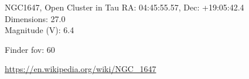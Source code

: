\begin{block}{NGC1647, Open Cluster in Tau}
    RA: 04:45:55.57, Dec: +19:05:42.4 \\ 
    Dimensions: 27.0 \\ 
    Magnitude (V): 6.4



    Finder fov: 60 

    \url{https://en.wikipedia.org/wiki/NGC_1647} 
\end{block}